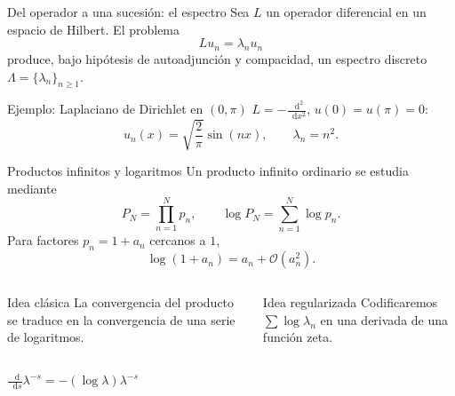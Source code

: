 \documentclass[aspectratio=169,11pt]{beamer}
\newcommand{\dd}{\mathop{}\!\mathrm{d}}
\begin{document}
\begin{frame}{Del operador a una sucesión: el espectro}
  Sea $L$ un operador diferencial en un espacio de Hilbert. El problema
  \[
    Lu_n=\lambda_nu_n
  \]
  produce, bajo hipótesis de autoadjunción y compacidad, un espectro discreto
  $\Lambda=\{\lambda_n\}_{n\ge1}$.
  \pause
  \begin{center}
  \end{center}
  \pause
  \begin{block}{Ejemplo: Laplaciano de Dirichlet en $(0,\pi)$}
    $L=-\frac{\dd^2}{\dd x^2}$, $u(0)=u(\pi)=0$:
    \[
      u_n(x)=\sqrt{\frac2\pi}\sin(nx),\qquad \lambda_n=n^2.
    \]
  \end{block}
\end{frame}

\begin{frame}{Productos infinitos y logaritmos}
  Un producto infinito ordinario se estudia mediante
  \[
    P_N=\prod_{n=1}^{N}p_n,
    \qquad \log P_N=\sum_{n=1}^{N}\log p_n.
  \]
  \pause
  Para factores $p_n=1+a_n$ cercanos a $1$,
  \[
    \log(1+a_n)=a_n+\mathcal O(a_n^2).
  \]
  \pause
  \begin{columns}[T,onlytextwidth]
      \begin{block}{Idea clásica}
        La convergencia del producto se traduce en la convergencia de una serie de
        logaritmos.
      \end{block}
      \pause
      \begin{block}{Idea regularizada}
        Codificaremos $\sum\log\lambda_n$ en una derivada de una función zeta.
      \end{block}
  \end{columns}
  \pause
  \vfill
  \centering $\displaystyle \frac{\dd}{\dd s}\lambda^{-s}=-(\log\lambda)\lambda^{-s}$
\end{frame}
\end{document}
